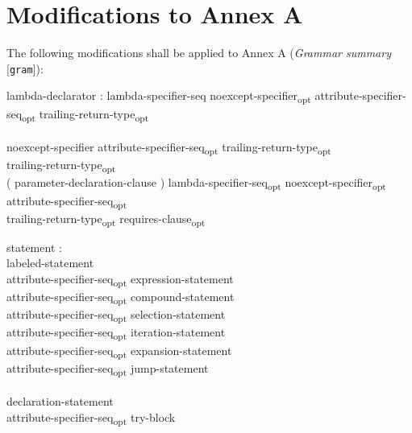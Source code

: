 \section{Modifications to Annex A}

The following modifications shall be applied to Annex A (\emph{Grammar summary}
[\texttt{gram}]):

\begin{modification}
lambda-declarator :
\tabto{1em}lambda-specifier-seq noexcept-specifier\textsubscript{opt}
attribute-specifier-seq\textsubscript{opt}
trailing-return-type\textsubscript{opt}\\
\tabto{2em}\\
\tabto{1em}noexcept-specifier attribute-specifier-seq\textsubscript{opt}
trailing-return-type\textsubscript{opt}
\\
\tabto{1em}trailing-return-type\textsubscript{opt}
\\
\tabto{1em}( parameter-declaration-clause ) lambda-specifier-seq\textsubscript{opt}
noexcept-specifier\textsubscript{opt}
attribute-specifier-seq\textsubscript{opt}\\
\tabto{2em}trailing-return-type\textsubscript{opt} requires-clause\textsubscript{opt}
\\
\end{modification}

\begin{modification}
statement :\\
\tabto{1em}labeled-statement\\
\tabto{1em}attribute-specifier-seq\textsubscript{opt} expression-statement\\
\tabto{1em}attribute-specifier-seq\textsubscript{opt} compound-statement\\
\tabto{1em}attribute-specifier-seq\textsubscript{opt} selection-statement\\
\tabto{1em}attribute-specifier-seq\textsubscript{opt} iteration-statement\\
\tabto{1em}attribute-specifier-seq\textsubscript{opt} expansion-statement\\
\tabto{1em}attribute-specifier-seq\textsubscript{opt} jump-statement\\
\tabto{1em}\\
\tabto{1em}declaration-statement\\
\tabto{1em}attribute-specifier-seq\textsubscript{opt} try-block\\

\\
\tabto{1em}
\end{modification}


